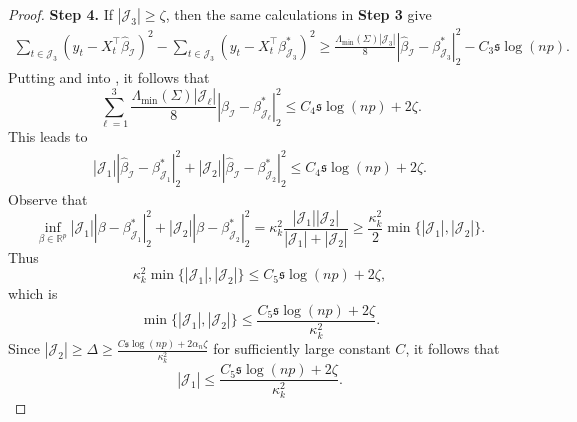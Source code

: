 \documentclass[11pt]{article}
\newcommand{\I}{{\mathcal I }}
\newcommand{\J}{{  \mathcal J } }
\newcommand{\s}{ { \mathfrak{s}  } }
\theoremstyle{plain}
\theoremstyle{definition}
\begin{document}
\begin{proof}
{\bf Step 4.} 
 If $|\J_3| \ge \zeta$, then the same calculations in {\bf Step 3} give
\begin{align} \label{eq:regression two change points step 4 term 1}
   \sum_{t  \in \J_{3   }  }(y_t  - X_t ^\top  \widehat \beta _\I ) ^2 
 -   \sum_{t  \in \J_ 3    }(y_t  -  X_t ^\top    \beta^*  _{\J_3   }  ) ^2   
 \ge    \frac{\Lambda_{\min} (\Sigma) |\J_3 | }{8}  |\widehat \beta _\I  -  \beta^* _{\J_ 3  }  |_2^2  -   C_3 \s  \log(np)       .
\end{align}
Putting  and   into ,
it follows that 
 $$  \sum_{\ell =1}^3 \frac{ \Lambda_{\min}(\Sigma) |\J_\ell | }{8}  |\widehat \beta _\I  -  \beta^* _{\J_ \ell  }  |_2^2      \le C_4 \s \log(np)  +2\zeta  .$$
 This leads to 
  \begin{align} \label{eq:step 4 colusion two changes}    |\J_1 |    |\widehat \beta _\I  -  \beta^* _{\J_ 1  }  |_2^2     + |\J_2 |   |\widehat \beta _\I  -  \beta^* _{\J_ 2  }  |_2^2       \le  C_4 \s \log(np)  +2\zeta  .\end{align}
Observe  that 
$$ \inf_{  \beta  \in \mathbb R ^p   }  |\J_1 |   | \beta    -  \beta^* _{\J_ 1  }  |_2^2  + |\J_2 |  |  \beta    -  \beta^* _{\J_ 2  }  |_2^2    = \kappa_k   ^2  \frac{|\J_1| |\J_2|}{| \J_1| +|\J_2|  }   \ge \frac{ \kappa_k  ^2 }{2} \min\{ |\J_1| ,|\J_2| \}     . $$ 
Thus
$$    \kappa_k ^2 \min\{ |\J_1| ,|\J_2| \}    \le  C_{5}  \s \log(np)   + 2  \zeta    ,$$
which is 
$$ \min\{ |\J_1| ,|\J_2| \}   \le  \frac{ C_{5}  \s \log(np)   + 2  \zeta }{\kappa_k ^2}.$$ 
Since  $ |\J_2  | \ge \Delta \ge  \frac{ C   \s \log(np)   + 2 \alpha_n \zeta }{\kappa_k ^2}     $
 for sufficiently large constant $C$, 
 it follows that
 $$   |\J_1|    \le\frac{ C_{5}  \s \log(np)   + 2  \zeta }{\kappa_k ^2}  .$$  
 

\end{proof}
\end{document}

